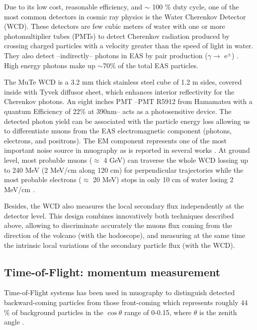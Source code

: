 \documentclass[letterpaper,11pt]{article}
\begin{document}
Due to its low cost, reasonable efficiency, and $\sim$ 100 $\%$ duty cycle, one of the most common detectors in cosmic ray physics is the Water Cherenkov  Detector (WCD). These detectors are few cubic meters of water with one or more photomultiplier tubes (PMTs) to detect Cherenkov radiation produced by crossing charged particles with a velocity greater than the speed of light in water. They also detect --indirectly-- photons in EAS by pair production ($\gamma \rightarrow$ e$^{\pm}$) \cite{allard2007detecting, allard2008use, allekotte2008surface}. High energy photons make up $\sim$70\% of the total EAS particles. 

The MuTe WCD is a 3.2 mm thick stainless steel cube of 1.2 m sides, covered inside with Tyvek diffusor sheet, which enhances interior reflectivity for the Cherenkov photons. An eight inches PMT --PMT R5912 from Hamamatsu with a quantum Efficiency of 22$\%$ at 390nm-- acts as a photosensitive device. The detected photon yield can be associated with the particle energy loss allowing us to differentiate muons from the EAS electromagnetic component (photons, electrons, and positrons). The EM component represents one of the most important noise source in muography as is reported in several works \cite{KUSAGAYA2015, Nishiyama2014Noise, Marteau2012Noise}. At ground level,  most probable muons ($\approx$ 4 GeV) can traverse the whole WCD lossing up to 240 MeV (2 MeV/cm along 120 cm) for perpendicular trajectories while the most probable electrons ($\approx$ 20 MeV) stops in only 10 cm of water losing 2 MeV/cm \cite{groom2001muon,groom2000passage,lohmann1985energy,olive2014passage,Vasquez2018, Motta2018}.

Besides, the WCD also measures the local secondary flux independently at the detector level. This design combines innovatively both techniques described above, allowing to discriminate accurately the muons flux coming from the direction of the volcano (with the hodoscope), and measuring at the same time the intrinsic local variations of the secondary particle flux (with the WCD). 

\subsection{Time-of-Flight: momentum measurement}

Time-of-Flight systems has been used in muography to distinguish detected backward-coming particles from those front-coming \cite{jourde2013experimental} which represents roughly 44 $\%$ of background particles in the $\cos \theta$ range of 0-0.15, where $\theta$ is the zenith angle \cite{nishiyama2016monte}.
\end{document}
